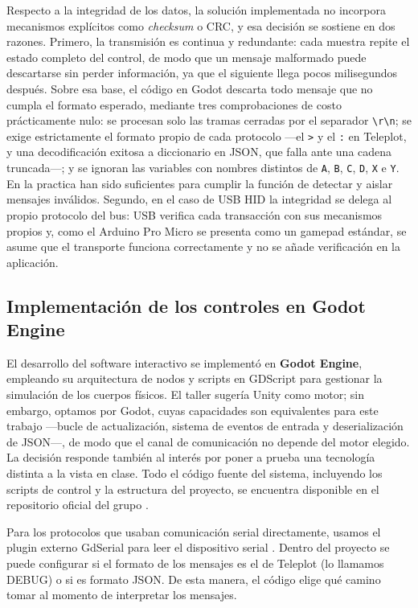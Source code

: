 \documentclass[journal]{IEEEtran}
\begin{document}
Respecto a la integridad de los datos, la solución implementada no incorpora mecanismos explícitos como \textit{checksum} o CRC, y esa decisión se sostiene en dos razones. Primero, la transmisión es continua y redundante: cada muestra repite el estado completo del control, de modo que un mensaje malformado puede descartarse sin perder información, ya que el siguiente llega pocos milisegundos después. Sobre esa base, el código en Godot descarta todo mensaje que no cumpla el formato esperado, mediante tres comprobaciones de costo prácticamente nulo: se procesan solo las tramas cerradas por el separador \texttt{\textbackslash r\textbackslash n}; se exige estrictamente el formato propio de cada protocolo ---el \texttt{>} y el \texttt{:} en Teleplot, y una decodificación exitosa a diccionario en JSON, que falla ante una cadena truncada---; y se ignoran las variables con nombres distintos de \texttt{A}, \texttt{B}, \texttt{C}, \texttt{D}, \texttt{X} e \texttt{Y}. En la practica han sido suficientes para cumplir la función de detectar y aislar mensajes inválidos. Segundo, en el caso de USB HID la integridad se delega al propio protocolo del bus: USB verifica cada transacción con sus mecanismos propios y, como el Arduino Pro Micro se presenta como un gamepad estándar, se asume que el transporte funciona correctamente y no se añade verificación en la aplicación.


\subsection{Implementación de los controles en Godot Engine}

El desarrollo del software interactivo se implementó en \textbf{Godot Engine}, empleando su arquitectura de nodos y scripts en GDScript para gestionar la simulación de los cuerpos físicos. El taller sugería Unity como motor; sin embargo, optamos por Godot, cuyas capacidades son equivalentes para este trabajo ---bucle de actualización, sistema de eventos de entrada y deserialización de JSON---, de modo que el canal de comunicación no depende del motor elegido. La decisión responde también al interés por poner a prueba una tecnología distinta a la vista en clase. Todo el código fuente del sistema, incluyendo los scripts de control y la estructura del proyecto, se encuentra disponible en el repositorio oficial del grupo \cite{botero2026repo}.

Para los protocolos que usaban comunicación serial directamente, usamos el plugin externo GdSerial para leer el dispositivo serial \cite{gdserial2026}. Dentro del proyecto se puede configurar si el formato de los mensajes es el de Teleplot (lo llamamos DEBUG) o si es formato JSON. De esta manera, el código elige qué camino tomar al momento de interpretar los mensajes.
\end{document}
